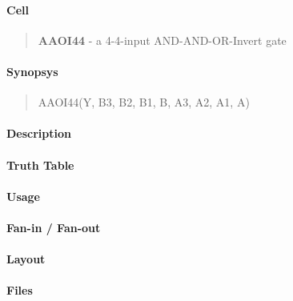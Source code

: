 \label{AAOI44}
\paragraph{Cell}
\begin{quote}
    \textbf{AAOI44} - a 4-4-input AND-AND-OR-Invert gate
\end{quote}

\paragraph{Synopsys}
\begin{quote}
    AAOI44(Y, B3, B2, B1, B, A3, A2, A1, A)
\end{quote}

\paragraph{Description}

%

\paragraph{Truth Table}
%

\paragraph{Usage}

\paragraph{Fan-in / Fan-out}

\paragraph{Layout}

\paragraph{Files}
